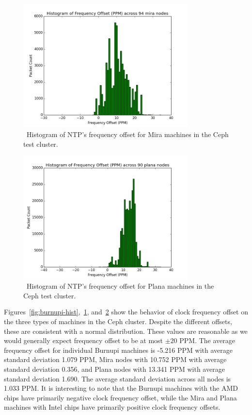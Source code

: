 \begin{figure}[!htbp]
  \centering
  \caption{~Histogram of NTP's frequency offset for Mira machines in the Ceph test cluster.}
  \label{fig:mira-hist}
  \includegraphics[width=0.8\textwidth]{mira-freq-offset.png}
\end{figure}

\begin{figure}[!htbp]
  \centering
  \caption{~Histogram of NTP's frequency offset for Plana machines in the Ceph test cluster.}
  \label{fig:plana-hist}
  \includegraphics[width=0.8\textwidth]{plana-freq-offset.png}
\end{figure}

Figures~\ref{fig:burnupi-hist},~\ref{fig:mira-hist},
and~\ref{fig:plana-hist} show the behavior of clock frequency offset
on the three types of machines in the Ceph cluster. Despite the
different offsets, these are consistent with a normal
distribution. These values are reasonable as we would generally expect
frequency offset to be at most $\pm 20$ PPM.  The average frequency
offset for individual Burnupi machines is -5.216 PPM with average
standard deviation 1.079 PPM, Mira nodes with 10.752 PPM with average
standard deviation 0.356, and Plana nodes with 13.341 PPM with average
standard deviation 1.690. The average standard deviation across all
nodes is 1.033 PPM. It is interesting to note that the Burnupi
machines with the AMD chips have primarily negative clock frequency
offset, while the Mira and Plana machines with Intel chips have
primarily positive clock frequency offsets.



